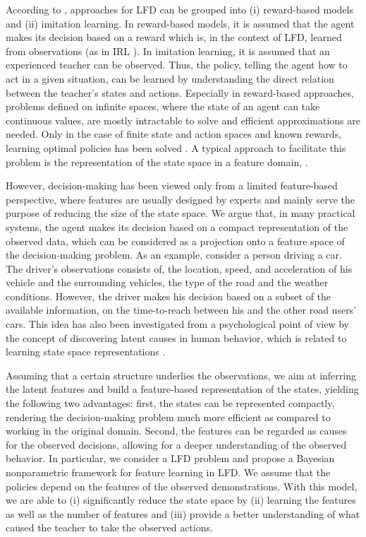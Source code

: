 \documentclass{article}
\begin{document}
According to \cite{Argall2009}, approaches for \ac{LFD} can be grouped into (i) reward-based models and (ii) imitation learning.
In reward-based models, it is assumed that the agent makes its decision based on a reward which is, in the context of \ac{LFD}, learned from observations (as in \ac{IRL} \cite{Ng2000}).
In imitation learning, it is assumed that an experienced teacher can be observed.
Thus, the policy, telling the agent how to act in a given situation, can be learned by understanding the direct relation between the teacher's states and actions.
Especially in reward-based approaches, problems defined on infinite spaces, where the state of an agent can take continuous values, are mostly intractable to solve and efficient approximations are needed.
Only in the case of finite state and action spaces and known rewards, learning optimal policies has been solved \cite{Bellman1957}.
A typical approach to facilitate this problem is the representation of the state space in a feature domain, \cf \cite{Pomerleau1991,Bradtke1996}. 

However, decision-making has been viewed only from a limited feature-based perspective, where features are usually designed by experts and mainly serve the purpose of reducing the size of the state space.
We argue that, in many practical systems, the agent makes its decision based on a compact representation of the observed data, which can be considered as a projection onto a feature space of the decision-making problem.
As an example, consider a person driving a car. 
The driver's observations consists of, \ia the location, speed, and acceleration of his vehicle and the surrounding vehicles, the type of the road and the weather conditions.
However, the driver makes his decision based on a subset of the available information, \eg on the time-to-reach between his and the other road users' cars.
This idea has also been investigated from a psychological point of view by the concept of discovering latent causes in human behavior, which is related to learning state space representations \cite{Gershman2015}.

Assuming that a certain structure underlies the observations, we aim at inferring the latent features and build a feature-based representation of the states, yielding the following two advantages:
first, the states can be represented compactly, rendering the decision-making problem much more efficient as compared to working in the original domain.
Second, the features can be regarded as causes for the observed decisions, allowing for a deeper understanding of the observed behavior. 
In particular, we consider a \ac{LFD} problem and propose a Bayesian nonparametric framework for feature learning in \ac{LFD}. 
We assume that the policies depend on the features of the observed demonstrations. 
With this model, we are able to (i) significantly reduce the state space by (ii) learning the features as well as the number of features and (iii) provide a better understanding of what caused the teacher to take the observed actions.
\end{document}

